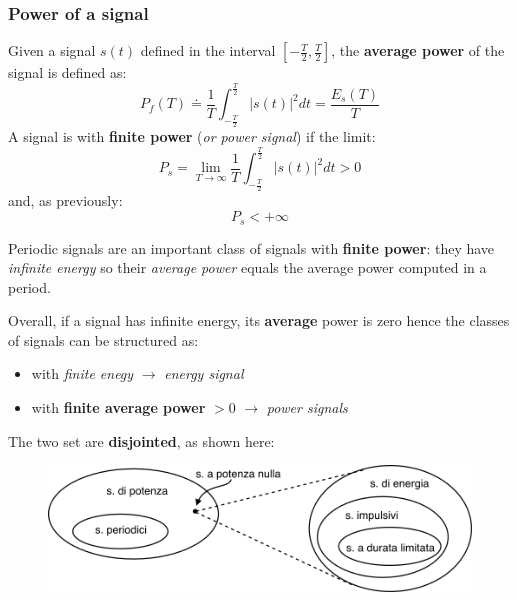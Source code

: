 \documentclass[10pt,a4paper]{report}
\theoremstyle{definition}
\begin{document}
\subsubsection{Power of a signal}
Given a signal $s(t)$ defined in the interval $[-\frac{T}{2}, \frac{T}{2}]$, the \textbf{average power} of the signal is defined as:
 \begin{equation}
 	P_{f}(T) \doteq \frac{1}{T}\int_{-\frac{T}{2}}^{\frac{T}{2}}|s(t)|^{2}dt =  \frac{E_{s}(T)}{T}
 \end{equation}
A signal is with \textbf{finite power} (\textit{or power signal}) if the limit:
\begin{equation}
	P_{s} = \lim_{T \rightarrow \infty} \frac{1}{T} \int_{-\frac{T}{2}}^{\frac{T}{2}} |s(t)|^{2}dt > 0
\end{equation}
and, as previously:
\begin{equation}
	P_{s} < +\infty
\end{equation}

Periodic signals are an important class of signals with \textbf{finite power}: they have \textit{infinite energy} so their \textit{average power} equals the average power computed in a period. 

Overall, if a signal has infinite energy, its \textbf{average} power is zero hence the classes of signals can be structured as:
\begin{itemize}
	\item with \textit{finite enegy} $\rightarrow$ \textit{energy signal}
	\item with \textbf{finite average power} $> 0$ $\rightarrow$ \textit{power signals}
\end{itemize} 
The two set are \textbf{disjointed}, as shown here:

\begin{figure}[h]
	\centering\includegraphics[scale=0.50]{images/Pasted image 20230511094738.png}
	
\end{figure}
\end{document}

